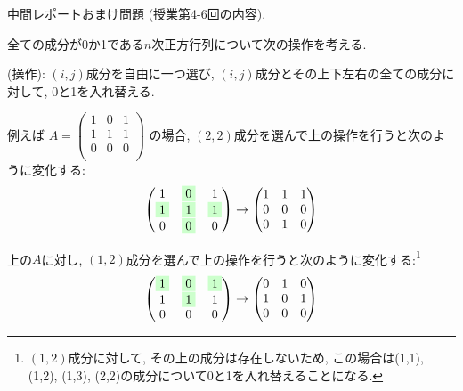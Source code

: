 \documentclass[dvipdfmx,a4paper,11pt]{article}
\theoremstyle{definition}
\begin{document}
\vspace{44pt} 

{\Large 中間レポートおまけ問題} (授業第4-6回の内容).
\vspace{11pt}

全ての成分が0か1である$n$次正方行列について次の操作を考える.

\vspace{5pt}
 \begin{tcolorbox}[
    colback = white,
    colframe = black,
    fonttitle = \bfseries,
    breakable = true]
(操作): $(i,j)$成分を自由に一つ選び, $(i,j)$成分とその上下左右の全ての成分に対して, 0と1を入れ替える.
 \end{tcolorbox}
\vspace{5pt}

例えば
$
A =
 \begin{pmatrix}
1 & 0 & 1\\
1 & 1 & 1\\
0 & 0 & 0 \\
 \end{pmatrix}
 $
 の場合, $(2,2)$成分を選んで上の操作を行うと次のように変化する:
 $$
  \begin{pmatrix}
1 & \colorbox[rgb]{0.8, 1.0, 0.8}{0} & 1\\
\colorbox[rgb]{0.8, 1.0, 0.8}{1} & \colorbox[rgb]{0.8, 1.0, 0.8}{1} & \colorbox[rgb]{0.8, 1.0, 0.8}{1}\\
0 & \colorbox[rgb]{0.8, 1.0, 0.8}{0} & 0 \\
 \end{pmatrix}
 \rightarrow 
  \begin{pmatrix}
1 & 1 & 1\\
0 & 0 & 0\\
0 & 1 & 0 \\
 \end{pmatrix}
 $$
 
上の$A$に対し, $(1,2)$成分を選んで上の操作を行うと次のように変化する:\footnote{$(1,2)$成分に対して, その上の成分は存在しないため, この場合は(1,1), (1,2), (1,3), (2,2)の成分について0と1を入れ替えることになる.}
 $$
  \begin{pmatrix}
\colorbox[rgb]{0.8, 1.0, 0.8}{1} & \colorbox[rgb]{0.8, 1.0, 0.8}{0} & \colorbox[rgb]{0.8, 1.0, 0.8}{1}\\
1 & \colorbox[rgb]{0.8, 1.0, 0.8}{1} & 1\\
0 & 0 & 0 \\
 \end{pmatrix}
 \rightarrow 
  \begin{pmatrix}
0 & 1 & 0\\
1 & 0 & 1\\
0 & 0 & 0 \\
 \end{pmatrix}
 $$
\end{document}
